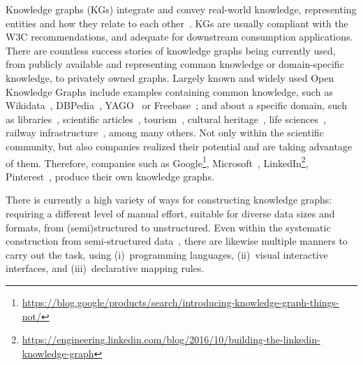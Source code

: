 Knowledge graphs (KGs) integrate and convey real-world knowledge, representing entities and how they relate to each other~\parencite{hogan2021kg}.
KGs are usually compliant with the W3C recommendations, and adequate for downstream consumption applications.
There are countless success stories of knowledge graphs being currently used, from publicly available and representing common knowledge or domain-specific knowledge, to privately owned graphs. 
Largely known and widely used Open Knowledge Graphs include examples containing common knowledge, such as Wikidata~\parencite{erxleben2014introducing}, DBPedia~\parencite{lehmann2015dbpedia}, YAGO~\parencite{pellissier2020yago} or Freebase~\parencite{bollacker2007freebase}; 
and about a specific domain, such as 
libraries~\parencite{vila2013datos}, 
scientific articles~\parencite{stocker2023orkg,farber2023semopenalex}, 
tourism~\parencite{karle2018building}, 
cultural heritage~\parencite{carriero2019arco}, 
life sciences~\parencite{dumontier2014bio2rdf,pinero2020disgenet},
railway infrastructure~\parencite{rojas2021leveraging}, among many others. 
Not only within the scientific community, but also companies realized their potential and are taking advantage of them. 
Therefore, companies such as
Google\footnote{\url{https://blog.google/products/search/introducing-knowledge-graph-things-not/}},
Microsoft~\parencite{farber2019microsoft},
LinkedIn\footnote{\url{https://engineering.linkedin.com/blog/2016/10/building-the-linkedin-knowledge-graph}}, 
Pinterest~\parencite{goncalves2019pinterest},
produce their own knowledge graphs. 


There is currently a high variety of ways for constructing knowledge graphs: requiring a different level of manual effort, suitable for diverse data sizes and formats, from (semi)structured to unstructured. %
Even within the systematic construction from semi-structured data~\parencite{Poggi2008}, there are likewise multiple manners to carry out the task, using (i)~programming languages, (ii)~visual interactive interfaces, and (iii)~declarative mapping rules. 

